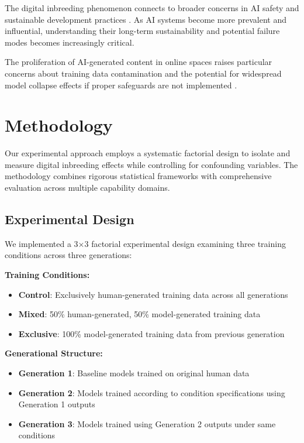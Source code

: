 \documentclass[11pt]{article}
\begin{document}
The digital inbreeding phenomenon connects to broader concerns in AI safety and sustainable development practices \citep{amodei2016concrete, russell2019human}. As AI systems become more prevalent and influential, understanding their long-term sustainability and potential failure modes becomes increasingly critical.

The proliferation of AI-generated content in online spaces raises particular concerns about training data contamination and the potential for widespread model collapse effects if proper safeguards are not implemented \citep{solaiman2019release}.

\section{Methodology}

Our experimental approach employs a systematic factorial design to isolate and measure digital inbreeding effects while controlling for confounding variables. The methodology combines rigorous statistical frameworks with comprehensive evaluation across multiple capability domains.

\subsection{Experimental Design}

We implemented a 3×3 factorial experimental design examining three training conditions across three generations:

\textbf{Training Conditions:}
\begin{itemize}
    \item \textbf{Control}: Exclusively human-generated training data across all generations
    \item \textbf{Mixed}: 50\% human-generated, 50\% model-generated training data
    \item \textbf{Exclusive}: 100\% model-generated training data from previous generation
\end{itemize}

\textbf{Generational Structure:}
\begin{itemize}
    \item \textbf{Generation 1}: Baseline models trained on original human data
    \item \textbf{Generation 2}: Models trained according to condition specifications using Generation 1 outputs
    \item \textbf{Generation 3}: Models trained using Generation 2 outputs under same conditions
\end{itemize}
\end{document}
